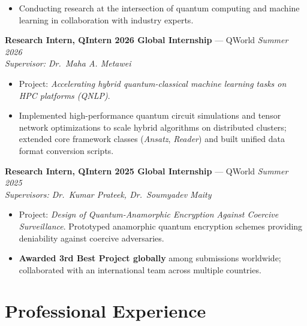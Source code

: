 \documentclass[a4paper,10pt]{article}
\begin{document}
\begin{itemize}
    \item Conducting research at the intersection of quantum computing and machine learning in collaboration with industry experts.
\end{itemize}

\vspace{2pt}
\textbf{Research Intern, QIntern 2026 Global Internship} --- QWorld
\hfill
\textit{Summer 2026}
\\
\textit{Supervisor: Dr.\ Maha A. Metawei}

\begin{itemize}
    \item Project: \textit{Accelerating hybrid quantum-classical machine learning tasks on HPC platforms (QNLP)}.

    \item Implemented high-performance quantum circuit simulations and tensor network optimizations to scale hybrid algorithms on distributed clusters; extended core framework classes (\textit{Ansatz}, \textit{Reader}) and built unified data format conversion scripts.
\end{itemize}

\vspace{2pt}
\textbf{Research Intern, QIntern 2025 Global Internship} --- QWorld
\hfill
\textit{Summer 2025}
\\
\textit{Supervisors: Dr.\ Kumar Prateek, Dr.\ Soumyadev Maity}

\begin{itemize}
    \item Project: \textit{Design of Quantum-Anamorphic Encryption Against Coercive Surveillance}.
    Prototyped anamorphic quantum encryption schemes providing deniability against coercive adversaries.

    \item \textbf{Awarded 3rd Best Project globally} among submissions worldwide; collaborated with an international team across multiple countries.
\end{itemize}

\section*{Professional Experience}
\end{document}
